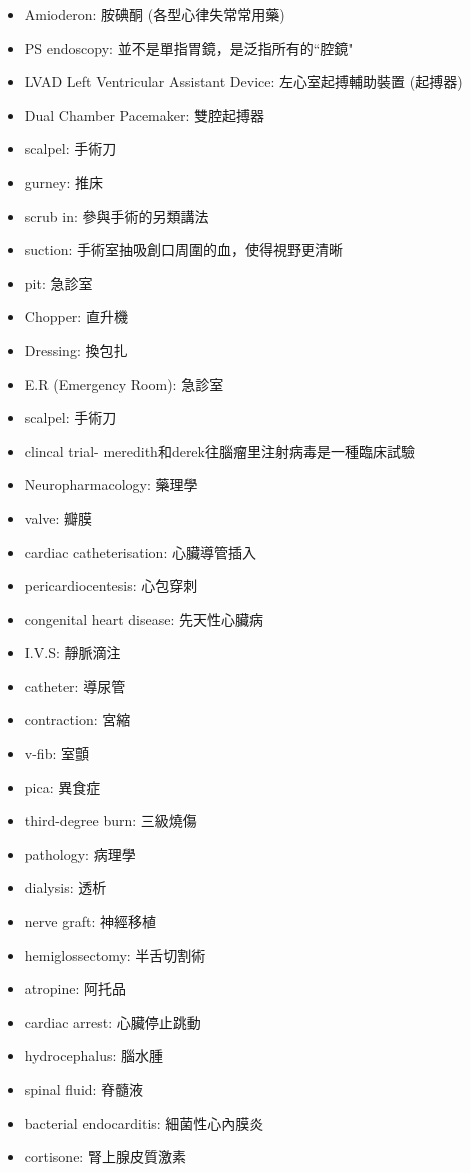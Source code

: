 \begin{multicols}{2}
\begin{itemize}
  \item Amioderon: 胺碘酮 (各型心律失常常用藥)
  \item PS endoscopy: 並不是單指胃鏡，是泛指所有的``腔鏡"
  \item LVAD Left Ventricular Assistant Device: 左心室起搏輔助裝置 (起搏器)
  \item Dual Chamber Pacemaker: 雙腔起搏器
  \item scalpel: 手術刀
  \item gurney: 推床
  \item scrub in: 參與手術的另類講法
  \item suction: 手術室抽吸創口周圍的血，使得視野更清晰
  \item pit: 急診室
  \item Chopper: 直升機
  \item Dressing: 換包扎
  \item E.R (Emergency Room): 急診室
  \item scalpel: 手術刀
  \item clincal trial- meredith和derek往腦瘤里注射病毒是一種臨床試驗
  \item Neuropharmacology: 藥理學
  \item valve: 瓣膜
  \item cardiac catheterisation: 心臟導管插入
  \item pericardiocentesis: 心包穿刺
  \item congenital heart disease: 先天性心臟病
  \item I.V.S: 靜脈滴注
  \item catheter: 導尿管
  \item contraction: 宮縮
  \item v-fib: 室顫
  \item pica: 異食症
  \item third-degree burn: 三級燒傷
  \item pathology: 病理學
  \item dialysis: 透析
  \item nerve graft: 神經移植
  \item hemiglossectomy: 半舌切割術
  \item atropine: 阿托品
  \item cardiac arrest: 心臟停止跳動
  \item hydrocephalus: 腦水腫
  \item spinal fluid: 脊髓液
  \item bacterial endocarditis: 細菌性心內膜炎
  \item cortisone: 腎上腺皮質激素

\end{itemize}
\end{multicols}
